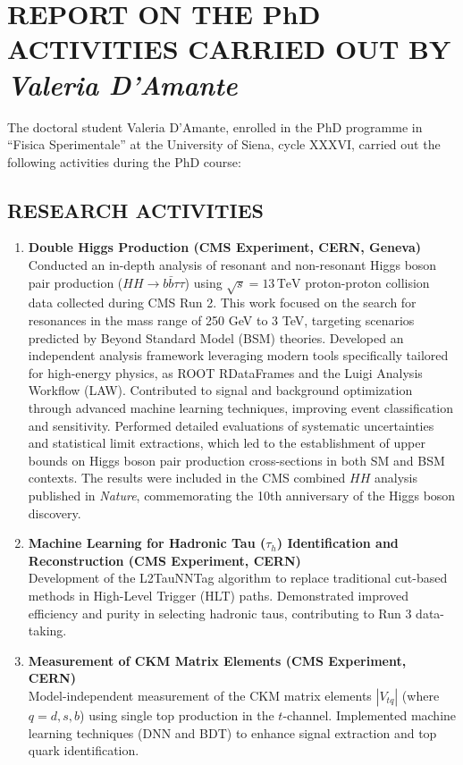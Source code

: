 \documentclass[12pt,a4paper,oneside]{extarticle}
\begin{document}
\pagestyle{default_page}

\section*{REPORT ON THE PhD ACTIVITIES CARRIED OUT BY \textit{Valeria D'Amante}}


The doctoral student Valeria D'Amante, enrolled in the PhD programme in “Fisica Sperimentale” at the University of Siena, cycle XXXVI, carried out the following activities during the PhD course:

\subsection*{RESEARCH ACTIVITIES}
\begin{enumerate}
    \item \textbf{Double Higgs Production (CMS Experiment, CERN, Geneva)}\\
    Conducted an in-depth analysis of resonant and non-resonant Higgs boson pair production ($HH \to b\bar{b}\tau\tau$) using $ \sqrt{s} = 13\,\textrm{TeV} $ proton-proton collision data collected during CMS Run 2. This work focused on the search for resonances in the mass range of 250 GeV to 3 TeV, targeting scenarios predicted by Beyond Standard Model (BSM) theories. Developed an independent analysis framework leveraging modern tools specifically tailored for high-energy physics, as ROOT RDataFrames and the Luigi Analysis Workflow (LAW). Contributed to signal and background optimization through advanced machine learning techniques, improving event classification and sensitivity. Performed detailed evaluations of systematic uncertainties and statistical limit extractions, which led to the establishment of upper bounds on Higgs boson pair production cross-sections in both SM and BSM contexts. The results were included in the CMS combined $HH$ analysis published in \textit{Nature}, commemorating the 10th anniversary of the Higgs boson discovery.

    \item \textbf{Machine Learning for Hadronic Tau ($\tau_h$) Identification and Reconstruction (CMS Experiment, CERN)}\\
    Development of the L2TauNNTag algorithm to replace traditional cut-based methods in High-Level Trigger (HLT) paths. Demonstrated improved efficiency and purity in selecting hadronic taus, contributing to Run 3 data-taking.

    \item \textbf{Measurement of CKM Matrix Elements (CMS Experiment, CERN)}\\
    Model-independent measurement of the CKM matrix elements $|V_{tq}|$ (where $q = d, s, b$) using single top production in the $t$-channel. Implemented machine learning techniques (DNN and BDT) to enhance signal extraction and top quark identification.


\end{enumerate}
\end{document}
